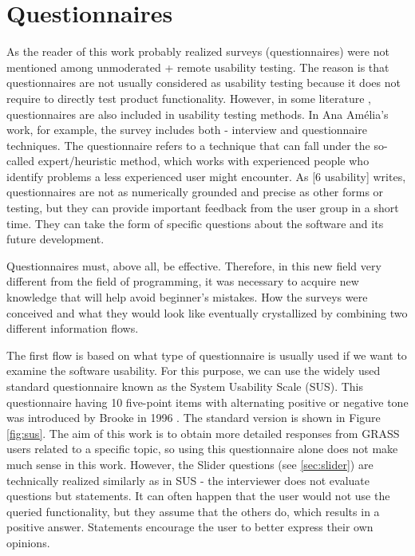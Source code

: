 \documentclass[a4paper,10pt,twoside]{article}
\begin{document}
\newpage
\vspace*{-1cm}
\section{Questionnaires}
\label{sec:questionnaires}

\noindent As the reader of this work probably realized surveys (questionnaires) were not mentioned among unmoderated + remote usability testing. The reason is that questionnaires are not usually considered as usability testing because it does not require to directly test product functionality. However, in some literature \cite{amelia} \cite{sixusability}, questionnaires are also included in usability testing methods. In Ana Amélia's work, for example, the survey includes both - interview and questionnaire techniques. The questionnaire refers to a technique that can fall under the so-called expert/heuristic method, which works with experienced people who identify problems a less experienced user might encounter. As [6 usability] writes, questionnaires are not as numerically grounded and precise as other forms or testing, but they can provide important feedback from the user group in a short time. They can take the form of specific questions about the software and its future development.

Questionnaires must, above all, be effective. Therefore, in this new field very different from the field of programming, it was necessary to acquire new knowledge that will help avoid beginner's mistakes. How the surveys were conceived and what they would look like eventually crystallized by combining two different information flows.

The first flow is based on what type of questionnaire is usually used if we want to examine the software usability. For this purpose, we can use the widely used standard questionnaire known as the System Usability Scale (SUS). This questionnaire having 10 five-point items with alternating positive or negative tone was introduced by Brooke in 1996 \cite{sus}. The standard version is shown in Figure \ref{fig:sus}. The aim of this work is to obtain more detailed responses from GRASS users related to a specific topic, so using this questionnaire alone does not make much sense in this work. However, the Slider questions (see \ref{sec:slider}) are technically realized similarly as in SUS - the interviewer does not evaluate questions but statements. It can often happen that the user would not use the queried functionality, but they assume that the others do, which results in a positive answer. Statements encourage the user to better express their own opinions.
\end{document}
